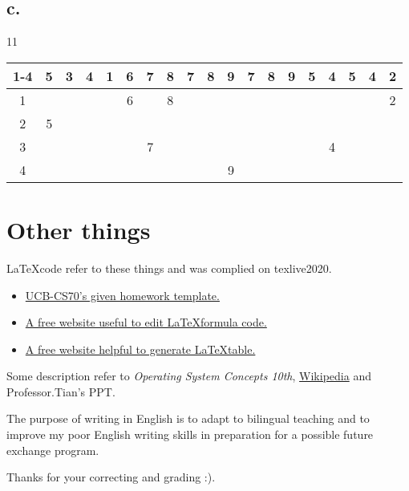 \documentclass[11pt]{article}
\begin{document}
\subsection*{c.}
11
\begin{table}[H]
    \centering
    \begin{tabular}{|c|c|c|c|c|c|c|c|c|c|c|c|c|c|c|c|c|c|c|}
    \hline
    1-4 & \textbf{5} & \textbf{3} & 4         & \textbf{1} & \textbf{6} & \textbf{7} & \textbf{8} & \textbf{7} & \textbf{8} & \textbf{9} & \textbf{7} & \textbf{8} & \textbf{9} & \textbf{5} & \textbf{4} & \textbf{5} & \textbf{4} & \textbf{2} \\ \hline
    1   & \textbf{}  &            &           &            & 6          &            & 8          &            &            & \textbf{}  &            &            & \textbf{}  &            & \textbf{}  &            & \textbf{}  & 2          \\ \hline
    2   & 5          &            &           & \textbf{}  &            & \textbf{}  &            & \textbf{}  &            &            & \textbf{}  &            &            &            &            &            &            & \textbf{}  \\ \hline
    3   &            & \textbf{}  &           &            &            & 7          & \textbf{}  &            & \textbf{}  &            &            & \textbf{}  &            &            & 4          &            &            &            \\ \hline
    4   &            &            & \textbf{} &            &            &            &            &            &            & 9          &            &            &            & \textbf{}  &            & \textbf{}  &            &            \\ \hline
    \end{tabular}
\end{table}

\section*{Other things}

    \LaTeX \space code refer to these things and was complied on texlive2020.
    \begin{itemize}
        \item  \href{https://www.eecs70.org/assets/misc/homework_template.tex}{UCB-CS70's given homework template.} 
        \item  \href{https://www.latexlive.com}{A free website useful to edit \LaTeX \space formula code.}
        \item  \href{https://www.tablesgenerator.com/}{A free website helpful to generate \LaTeX \space table.}
    \end{itemize}

    Some description refer to \textit{Operating System Concepts 10th}, \href{https://en.wikipedia.org}{Wikipedia} 
    and Professor.Tian's PPT.

    The purpose of writing in English is to adapt to bilingual teaching and to improve my poor English 
    writing skills in preparation for a possible future exchange program. 

    Thanks for your correcting and grading :).
\end{document}
